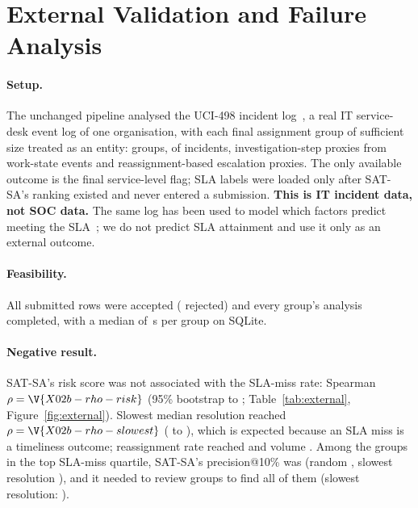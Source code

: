 \section{External Validation and Failure Analysis}
\label{sec:external}

\paragraph{Setup.}
The unchanged pipeline analysed the UCI-498 incident log~\cite{amaral2018uci498},
a real IT service-desk event log of one organisation, with each final assignment
group of sufficient size treated as an entity:  groups,
 of  incidents, 
investigation-step proxies from work-state events and 
reassignment-based escalation proxies. The only available outcome is the final
service-level flag; SLA labels were loaded only after SAT-SA's ranking existed and
never entered a submission. \textbf{This is IT incident data, not SOC data.}
The same log has been used to model which factors predict meeting the SLA~\cite{swain2022sla};
we do not predict SLA attainment and use it only as an external outcome.

\paragraph{Feasibility.}
All  submitted rows were accepted
( rejected) and every group's analysis completed, with a
median of \,s per group on SQLite.

\paragraph{Negative result.}
SAT-SA's risk score was not associated with the SLA-miss rate: Spearman
$\rho=\V{X02b-rho-risk}$ (95\% bootstrap  to
; Table~\ref{tab:external}, Figure~\ref{fig:external}).
Slowest median resolution reached $\rho=\V{X02b-rho-slowest}$
( to ), which is expected because an
SLA miss is a timeliness outcome; reassignment rate reached
 and volume . Among the
 groups in the top SLA-miss quartile, SAT-SA's precision@10\% was
 (random , slowest resolution
), and it needed to review  groups to
find all of them (slowest resolution: ).


